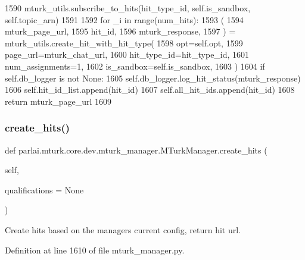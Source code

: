 \begin{DoxyCode}
1590             mturk\_utils.subscribe\_to\_hits(hit\_type\_id, self.is\_sandbox, self.topic\_arn)
1591 
1592         \textcolor{keywordflow}{for} \_i \textcolor{keywordflow}{in} range(num\_hits):
1593             (
1594                 mturk\_page\_url,
1595                 hit\_id,
1596                 mturk\_response,
1597             ) = mturk\_utils.create\_hit\_with\_hit\_type(
1598                 opt=self.opt,
1599                 page\_url=mturk\_chat\_url,
1600                 hit\_type\_id=hit\_type\_id,
1601                 num\_assignments=1,
1602                 is\_sandbox=self.is\_sandbox,
1603             )
1604             \textcolor{keywordflow}{if} self.db\_logger \textcolor{keywordflow}{is} \textcolor{keywordflow}{not} \textcolor{keywordtype}{None}:
1605                 self.db\_logger.log\_hit\_status(mturk\_response)
1606             self.hit\_id\_list.append(hit\_id)
1607             self.all\_hit\_ids.append(hit\_id)
1608         \textcolor{keywordflow}{return} mturk\_page\_url
1609 
\end{DoxyCode}
\mbox{\label{classparlai_1_1mturk_1_1core_1_1dev_1_1mturk__manager_1_1MTurkManager_ac5d939202bcf4714b4f6f38b2e9650c0}} 
\subsubsection{\texorpdfstring{create\+\_\+hits()}{create\_hits()}}
{\footnotesize\ttfamily def parlai.\+mturk.\+core.\+dev.\+mturk\+\_\+manager.\+M\+Turk\+Manager.\+create\+\_\+hits (\begin{DoxyParamCaption}\item[{}]{self,  }\item[{}]{qualifications = {\ttfamily None} }\end{DoxyParamCaption})}

\begin{DoxyVerb}Create hits based on the managers current config, return hit url.
\end{DoxyVerb}
 

Definition at line 1610 of file mturk\+\_\+manager.\+py.


